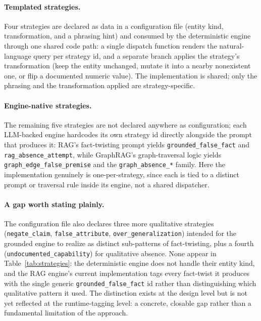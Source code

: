 \documentclass[11pt,a4paper]{article}
\begin{document}
\paragraph{Templated strategies.} Four strategies are declared as data in a
configuration file (entity kind, transformation, and a phrasing hint) and
consumed by the deterministic engine through one shared code path: a single
dispatch function renders the natural-language query per strategy id, and a
separate branch applies the strategy's transformation (keep the entity
unchanged, mutate it into a nearby nonexistent one, or flip a documented
numeric value). The implementation is shared; only the phrasing and the
transformation applied are strategy-specific.

\paragraph{Engine-native strategies.} The remaining five strategies are not
declared anywhere as configuration; each LLM-backed engine hardcodes its
own strategy id directly alongside the prompt that produces it: RAG's
fact-twisting prompt yields \texttt{grounded\allowbreak\_false\allowbreak\_fact}
and \texttt{rag\allowbreak\_absence\allowbreak\_attempt}, while GraphRAG's
graph-traversal logic yields
\texttt{graph\allowbreak\_edge\allowbreak\_false\allowbreak\_premise} and the
\texttt{graph\allowbreak\_absence\_*} family. Here the implementation genuinely
is one-per-strategy, since each is tied to a distinct prompt or traversal rule
inside its engine, not a shared dispatcher.

\paragraph{A gap worth stating plainly.} The configuration file also declares
three more qualitative strategies (\texttt{negate\_claim},
\texttt{false\_attribute}, \texttt{over\_generalization}) intended for the
grounded engine to realize as distinct sub-patterns of fact-twisting, plus a
fourth (\texttt{undocumented\_capability}) for qualitative absence. None
appear in Table~\ref{tab:strategies}: the deterministic engine does not handle
their entity kind, and the RAG engine's current implementation tags every
fact-twist it produces with the single generic \texttt{grounded\_false\_fact}
id rather than distinguishing which qualitative pattern it used. The
distinction exists at the design level but is not yet reflected at the
runtime-tagging level: a concrete, closable gap rather than a fundamental
limitation of the approach.
\end{document}
